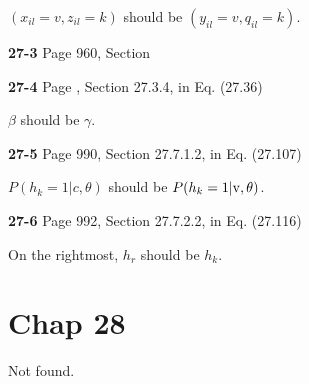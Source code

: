 \documentclass[aps,preprint,a4]{revtex4-1}
\begin{document}
$(x_{il}=v, z_{il}=k)$ should be $(y_{il}=v, q_{il}=k)$.

{\color{red}\textbf{27-3}} Page 960, Section 

{\color{red}\textbf{27-4}} Page , Section 27.3.4, in Eq. (27.36)

$\beta$ should be $\gamma$.

{\color{red}\textbf{27-5}} Page 990, Section 27.7.1.2, in Eq. (27.107)

$P(h_{k}=1|c,\theta)$ should be $P(h_{k}=1|\rm v,\theta)$.

{\color{red}\textbf{27-6}} Page 992, Section 27.7.2.2, in Eq. (27.116)

On the rightmost, $h_{r}$ should be $h_{k}$.

\section{Chap 28}
Not found.

\end{document}
